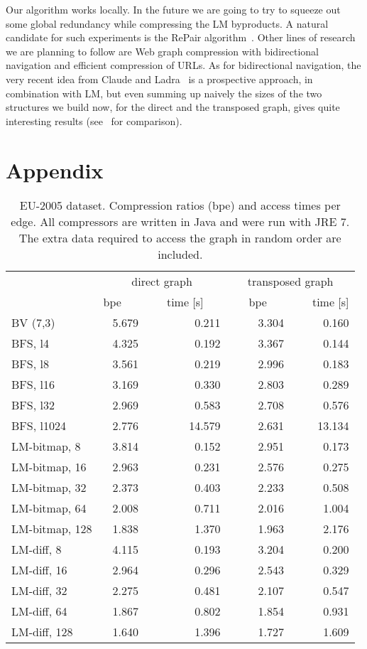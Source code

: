 \documentclass[envcountsame]{llncs}
\begin{document}
Our algorithm works locally.
In the future we are going to try to squeeze out some global redundancy 
while compressing the LM byproducts.
A natural candidate for such experiments is the RePair algorithm~\cite{LM00,CNtweb10}.
Other lines of research we are planning to follow are Web graph compression with 
bidirectional navigation and efficient compression of URLs.
As for bidirectional navigation, the very recent idea from Claude and Ladra~\cite{CL11} 
is a prospective approach, in combination with LM, but even summing up naively the sizes 
of the two structures we build now, for the direct and the transposed graph, 
gives quite interesting results (see~\cite{HNsnakdd11,CL11} for comparison).




\section*{Appendix}


\begin{table}
\centering
\begin{tabular}{lrrrr}
\hline
        & \multicolumn{2}{c}{direct graph} & \multicolumn{2}{c}{transposed graph} \\
\cline{2-5}
        &  bpe~~~&~~~time [s]~~~&~~~bpe~~~&~~~time [s] \\
\hline
BV (7,3) & 5.679 & 0.211 & 3.304 & 0.160 \\
BFS, l4 & 4.325 & 0.192 & 3.367 & 0.144 \\
BFS, l8 & 3.561 & 0.219 & 2.996 & 0.183 \\
BFS, l16 & 3.169 & 0.330 & 2.803 & 0.289 \\
BFS, l32 & 2.969 & 0.583 & 2.708 & 0.576 \\
BFS, l1024 & 2.776 & 14.579 & 2.631 & 13.134 \\
LM-bitmap, 8 & 3.814 & 0.152 & 2.951 & 0.173 \\
LM-bitmap, 16 & 2.963 & 0.231 & 2.576 & 0.275 \\
LM-bitmap, 32 & 2.373 & 0.403 & 2.233 & 0.508 \\
LM-bitmap, 64 & 2.008 & 0.711 & 2.016 & 1.004 \\
LM-bitmap, 128 & 1.838 & 1.370 & 1.963 & 2.176 \\
LM-diff, 8 & 4.115 & 0.193 & 3.204 & 0.200 \\
LM-diff, 16 & 2.964 & 0.296 & 2.543 & 0.329 \\
LM-diff, 32 & 2.275 & 0.481 & 2.107 & 0.547 \\
LM-diff, 64 & 1.867 & 0.802 & 1.854 & 0.931 \\
LM-diff, 128 & 1.640 & 1.396 & 1.727 & 1.609 \\
\hline
\end{tabular}
\vspace{4mm}
\caption{EU-2005 dataset. Compression ratios (bpe) and access times per edge. 
All compressors are written in Java and were run with JRE 7.
The extra data required to access the graph in random order are included.
}
\label{table:app_eu}
\end{table}
\end{document}
